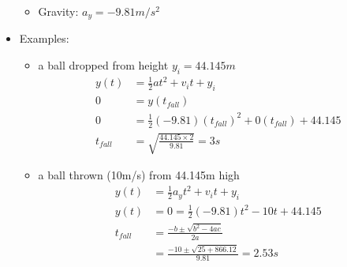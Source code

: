 \documentclass{article}
\begin{document}
\begin{itemize}
\begin{itemize}
    \item Gravity: $a_{y} = -9.81m/s^{2}$
  \end{itemize}
  \item Examples:
  \begin{itemize}
    \item a ball dropped from height $y_{i} = 44.145m$\\
    \begin{align*}
      y(t) &= \frac{1}{2}at^{2} + v_{i}t + y_{i}\\
      0 &= y(t_{fall})\\
      0 &= \frac{1}{2}(-9.81)(t_{fall})^{2} + 0(t_{fall}) + 44.145\\
      t_{fall} &= \sqrt{\frac{44.145 \times 2}{9.81}} = 3s
    \end{align*}
    \item a ball thrown (10m/s) from 44.145m high
    \begin{align*}
      y(t) &= \frac{1}{2}a_{y}t^{2} + v_{i}t + y_{i}\\
      y(t) &= 0 = \frac{1}{2}(-9.81)t^{2} - 10t + 44.145\\
      t_{fall} &= \frac{-b \pm \sqrt{b^{2} - 4ac}}{2a}\\
      &= \frac{-10 \pm \sqrt{25 + 866.12}}{9.81} = 2.53s
    \end{align*}
  \end{itemize}
\end{itemize}
\end{document}
